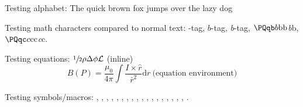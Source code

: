 Testing alphabet: The quick brown fox jumps over the lazy dog

Testing math characters compared to normal text: \Pqb-tag, $b$-tag, \emph{b}-tag, $\Pqb b\mathrm{b}\text{b}$\emph{b}b, $\Pqc c\mathrm{c}\text{c}$\emph{c}c.

Testing equations: $\sfrac{1}{2} \rho \Delta \phi \mathcal{L}$ (inline)
\begin{equation}
B(P) = \frac{\mu_0}{4\pi} \int \frac{I \times \hat{r}}{\bar{r}^2}\mathrm{d}r \ \text{(equation environment)}
\end{equation}

Testing symbols/macros: \eV, \MeV, \GeV, \TeV, \pt, \ptmiss, \met, \HT, \mht, \mt, \aDark, \rinv, \mqdark, \doubleMuCr, \doubleLepMass, \alphat, \ttbarpjets, \wtolnupjets, \LSP.

